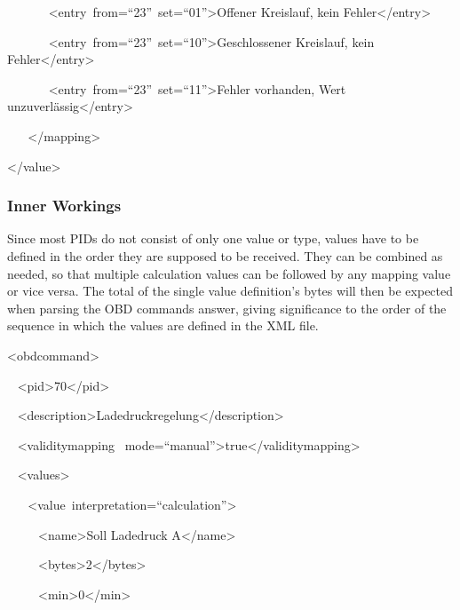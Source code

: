 {~ ~ ~ ~
}{\textless{}entry}{~}{from}{=}{``23''}{~}{set}{=}{``01''}{\textgreater{}}{Offener
Kreislauf, kein Fehler}{\textless{}/entry\textgreater{}}

{~ ~ ~ ~
}{\textless{}entry}{~}{from}{=}{``23''}{~}{set}{=}{``10''}{\textgreater{}}{Geschlossener
Kreislauf, kein Fehler}{\textless{}/entry\textgreater{}}

{~ ~ ~ ~
}{\textless{}entry}{~}{from}{=}{``23''}{~}{set}{=}{``11''}{\textgreater{}}{Fehler
vorhanden, Wert unzuverlässig}{\textless{}/entry\textgreater{}}

{~ ~ }{\textless{}/mapping\textgreater{}}{~ ~ }

{\textless{}/value\textgreater{}}

\hypertarget{h.q2wfq2ktke27}{\subsubsection{\texorpdfstring{{Inner
Workings}}{Inner Workings}}\label{h.q2wfq2ktke27}}

{Since most PIDs do not consist of only one value or type, values have
to be defined in the order they are supposed to be received. They can be
combined as needed, so that multiple calculation values can be followed
by any mapping value or vice versa. The total of the single value
definition's bytes will then be expected when parsing the OBD commands
answer, giving significance to the order of the sequence in which the
values are defined in the XML file.}

{\textless{}obdcommand\textgreater{}}

{~ }{\textless{}pid\textgreater{}}{70}{\textless{}/pid\textgreater{}}

{~
}{\textless{}description\textgreater{}}{Ladedruckregelung}{\textless{}/description\textgreater{}}

{~ }{\textless{}validitymapping}{~
}{mode}{=}{``manual''}{\textgreater{}}{true}{\textless{}/validitymapping\textgreater{}}

{~ }{\textless{}values\textgreater{}}

{~ ~
}{\textless{}value}{~}{interpretation}{=}{``calculation''\textgreater{}}

{~ ~ ~ }{\textless{}name\textgreater{}}{Soll Ladedruck
A}{\textless{}/name\textgreater{}}

{~ ~ ~
}{\textless{}bytes\textgreater{}}{2}{\textless{}/bytes\textgreater{}}

{~ ~ ~ }{\textless{}min\textgreater{}}{0}{\textless{}/min\textgreater{}}

